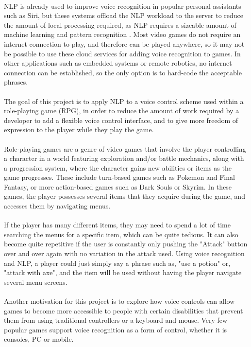 \documentclass[11pt]{article}
\begin{document}
\\
NLP is already used to improve voice recognition in popular personal assistants such as Siri, but these systems offload the NLP workload to the server to reduce the amount of local processing required, as NLP requires a sizeable amount of machine learning and pattern recognition \cite{RefWorks:21}. Most video games do not require an internet connection to play, and therefore can be played anywhere, so it may not be possible to use these cloud services for adding voice recognition to games. In other applications such as embedded systems or remote robotics, no internet connection can be established, so the only option is to hard-code the acceptable phrases.
\\
\\
The goal of this project is to apply NLP to a voice control scheme used within a role-playing game (RPG), in order to reduce the amount of work required by a developer to add a flexible voice control interface, and to give more freedom of expression to the player while they play the game.
\\
\\
Role-playing games are a genre of video games that involve the player controlling a character in a world featuring exploration and/or battle mechanics, along with a progression system, where the character gains new abilities or items as the game progresses. These include turn-based games such as Pokemon and Final Fantasy, or more action-based games such as Dark Souls or Skyrim. In these games, the player possesses several items that they acquire during the game, and accesses them by navigating menus.
\\
\\
If the player has many different items, they may need to spend a lot of time searching the menus for a specific item, which can be quite tedious. It can also become quite repetitive if the user is constantly only pushing the "Attack" button over and over again with no variation in the attack used. Using voice recognition and NLP, a player could just simply say a phrase such as, "use a potion" or, "attack with axe", and the item will be used without having the player navigate several menu screens.
\\
\\
Another motivation for this project is to explore how voice controls can allow games to become more accessible to people with certain disabilities that prevent them from using traditional controllers or a keyboard and mouse. Very few popular games support voice recognition as a form of control, whether it is consoles, PC or mobile.
\end{document}

